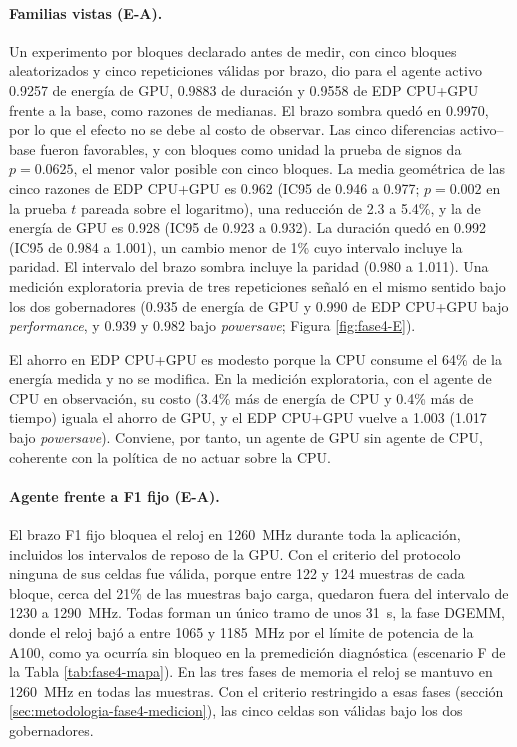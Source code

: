 \paragraph{Familias vistas (E-A).} Un experimento por bloques declarado antes de medir, con cinco bloques aleatorizados y cinco repeticiones válidas por brazo, dio para el agente activo 0.9257 de energía de GPU, 0.9883 de duración y 0.9558 de EDP CPU+GPU frente a la base, como razones de medianas. El brazo sombra quedó en 0.9970, por lo que el efecto no se debe al costo de observar. Las cinco diferencias activo--base fueron favorables, y con bloques como unidad la prueba de signos da $p=0.0625$, el menor valor posible con cinco bloques. La media geométrica de las cinco razones de EDP CPU+GPU es 0.962 (IC95 de 0.946 a 0.977; $p=0.002$ en la prueba $t$ pareada sobre el logaritmo), una reducción de 2.3 a 5.4\%, y la de energía de GPU es 0.928 (IC95 de 0.923 a 0.932). La duración quedó en 0.992 (IC95 de 0.984 a 1.001), un cambio menor de 1\% cuyo intervalo incluye la paridad. El intervalo del brazo sombra incluye la paridad (0.980 a 1.011). Una medición exploratoria previa de tres repeticiones señaló en el mismo sentido bajo los dos gobernadores (0.935 de energía de GPU y 0.990 de EDP CPU+GPU bajo \textit{performance}, y 0.939 y 0.982 bajo \textit{powersave}; Figura \ref{fig:fase4-E}).

El ahorro en EDP CPU+GPU es modesto porque la CPU consume el 64\% de la energía medida y no se modifica. En la medición exploratoria, con el agente de CPU en observación, su costo (3.4\% más de energía de CPU y 0.4\% más de tiempo) iguala el ahorro de GPU, y el EDP CPU+GPU vuelve a 1.003 (1.017 bajo \textit{powersave}). Conviene, por tanto, un agente de GPU sin agente de CPU, coherente con la política de no actuar sobre la CPU.

\paragraph{Agente frente a F1 fijo (E-A).} El brazo F1 fijo bloquea el reloj en 1260~MHz durante toda la aplicación, incluidos los intervalos de reposo de la GPU. Con el criterio del protocolo ninguna de sus celdas fue válida, porque entre 122 y 124 muestras de cada bloque, cerca del 21\% de las muestras bajo carga, quedaron fuera del intervalo de 1230 a 1290~MHz. Todas forman un único tramo de unos 31~s, la fase DGEMM, donde el reloj bajó a entre 1065 y 1185~MHz por el límite de potencia de la A100, como ya ocurría sin bloqueo en la premedición diagnóstica (escenario F de la Tabla \ref{tab:fase4-mapa}). En las tres fases de memoria el reloj se mantuvo en 1260~MHz en todas las muestras. Con el criterio restringido a esas fases (sección \ref{sec:metodologia-fase4-medicion}), las cinco celdas son válidas bajo los dos gobernadores.

